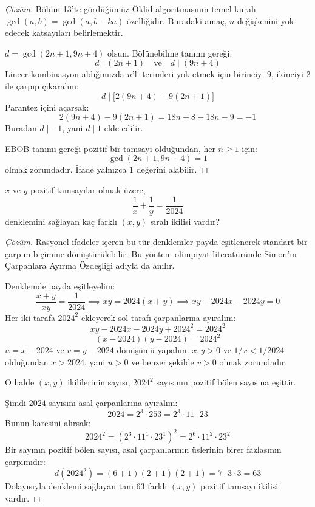 \begin{proof}[Çözüm]
Bölüm 13'te gördüğümüz Öklid algoritmasının temel kuralı $\gcd(a, b) = \gcd(a, b - k a)$ özelliğidir. Buradaki amaç, $n$ değişkenini yok edecek katsayıları belirlemektir.

$d = \gcd(2n + 1, 9n + 4)$ olsun.
Bölünebilme tanımı gereği:
\[
d \mid (2n + 1) \quad \text{ve} \quad d \mid (9n + 4)
\]
Lineer kombinasyon aldığımızda $n$'li terimleri yok etmek için birinciyi 9, ikinciyi 2 ile çarpıp çıkaralım:
\[
d \mid \big[ 2(9n + 4) - 9(2n + 1) \big]
\]
Parantez içini açarsak:
\[
2(9n + 4) - 9(2n + 1) = 18n + 8 - 18n - 9 = -1
\]
Buradan $d \mid -1$, yani $d \mid 1$ elde edilir. 

EBOB tanımı gereği pozitif bir tamsayı olduğundan, her $n \ge 1$ için:
\[
\gcd(2n + 1, 9n + 4) = 1
\]
olmak zorundadır. İfade yalnızca $1$ değerini alabilir.
\end{proof}

\begin{example}
$x$ ve $y$ pozitif tamsayılar olmak üzere,
\[
\frac{1}{x} + \frac{1}{y} = \frac{1}{2024}
\]
denklemini sağlayan kaç farklı $(x, y)$ sıralı ikilisi vardır?
\end{example}

\begin{proof}[Çözüm]
Rasyonel ifadeler içeren bu tür denklemler payda eşitlenerek standart bir çarpım biçimine dönüştürülebilir. Bu yöntem olimpiyat literatüründe Simon'ın Çarpanlara Ayırma Özdeşliği adıyla da anılır.

Denklemde payda eşitleyelim:
\[
\frac{x + y}{xy} = \frac{1}{2024} \implies xy = 2024(x + y) \implies xy - 2024x - 2024y = 0
\]
Her iki tarafa $2024^2$ ekleyerek sol tarafı çarpanlarına ayıralım:
\[
xy - 2024x - 2024y + 2024^2 = 2024^2
\]
\[
(x - 2024)(y - 2024) = 2024^2
\]
$u = x - 2024$ ve $v = y - 2024$ dönüşümü yapalım. $x, y > 0$ ve $1/x < 1/2024$ olduğundan $x > 2024$, yani $u > 0$ ve benzer şekilde $v > 0$ olmak zorundadır.

O halde $(x, y)$ ikililerinin sayısı, $2024^2$ sayısının pozitif bölen sayısına eşittir.

Şimdi $2024$ sayısını asal çarpanlarına ayıralım:
\[
2024 = 2^3 \cdot 253 = 2^3 \cdot 11 \cdot 23
\]
Bunun karesini alırsak:
\[
2024^2 = (2^3 \cdot 11^1 \cdot 23^1)^2 = 2^6 \cdot 11^2 \cdot 23^2
\]
Bir sayının pozitif bölen sayısı, asal çarpanlarının üslerinin birer fazlasının çarpımıdır:
\[
d(2024^2) = (6 + 1)(2 + 1)(2 + 1) = 7 \cdot 3 \cdot 3 = 63
\]
Dolayısıyla denklemi sağlayan tam $63$ farklı $(x, y)$ pozitif tamsayı ikilisi vardır.
\end{proof}

